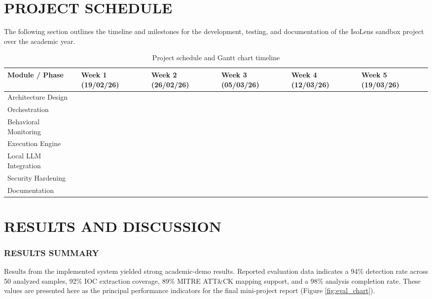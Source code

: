 \documentclass[a4paper,12pt,oneside]{report}
\begin{document}
\chapter{PROJECT SCHEDULE}
The following section outlines the timeline and milestones for the development, testing, and documentation of the IsoLens sandbox project over the academic year.

\begin{table}[H]
\centering
\caption{Project schedule and Gantt chart timeline}
\label{tab:project_schedule}
\renewcommand{\arraystretch}{1.5}
\setlength{\tabcolsep}{3pt}
\begin{tabularx}{\textwidth}{>{\raggedright\arraybackslash}X >{\centering\arraybackslash}p{2cm} >{\centering\arraybackslash}p{2cm} >{\centering\arraybackslash}p{2cm} >{\centering\arraybackslash}p{2cm} >{\centering\arraybackslash}p{2cm}}
\toprule
\rowcolor{black!10}
\textbf{Module / Phase} & \textbf{Week 1 \newline(19/02/26)} & \textbf{Week 2 \newline(26/02/26)} & \textbf{Week 3 \newline(05/03/26)} & \textbf{Week 4 \newline(12/03/26)} & \textbf{Week 5 \newline(19/03/26)} \\
\midrule
Architecture Design & \cellcolor{black!70} & & & & \\
Orchestration & \cellcolor{black!70} & \cellcolor{black!70} & & & \\
Behavioral Monitoring & & \cellcolor{black!70} & \cellcolor{black!70} & & \\
Execution Engine & & & \cellcolor{black!70} & & \\
Local LLM Integration & & & & \cellcolor{black!70} & \\
Security Hardening & & & & \cellcolor{black!70} & \cellcolor{black!70} \\
Documentation & & & & & \cellcolor{black!70} \\
\bottomrule
\end{tabularx}
\end{table}


\chapter{RESULTS AND DISCUSSION}
\subsection{RESULTS SUMMARY}
Results from the implemented system yielded strong academic-demo results. Reported evaluation data indicates a 94\% detection rate across 50 analyzed samples, 92\% IOC extraction coverage, 89\% MITRE ATT\&CK mapping support, and a 98\% analysis completion rate. These values are presented here as the principal performance indicators for the final mini-project report (Figure \ref{fig:eval_chart}).
\end{document}

